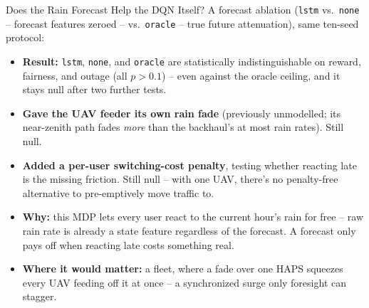 \documentclass[aspectratio=169]{beamer}
\begin{document}
\begin{frame}{Does the Rain Forecast Help the DQN Itself?}
\footnotesize
A forecast ablation (\texttt{lstm} vs.\ \texttt{none} -- forecast
features zeroed -- vs.\ \texttt{oracle} -- true future attenuation),
same ten-seed protocol:
\vspace{2mm}
\begin{itemize}\setlength{\itemsep}{4pt}
  \item \textbf{Result:} \texttt{lstm}, \texttt{none}, and
        \texttt{oracle} are statistically indistinguishable on reward,
        fairness, and outage (all $p>0.1$) -- even against the oracle
        ceiling, and it stays null after two further tests.
  \item \textbf{Gave the UAV feeder its own rain fade} (previously
        unmodelled; its near-zenith path fades \emph{more} than the
        backhaul's at most rain rates). Still null.
  \item \textbf{Added a per-user switching-cost penalty}, testing
        whether reacting late is the missing friction. Still null --
        with one UAV, there's no penalty-free alternative to
        pre-emptively move traffic to.
  \item \textbf{Why:} this MDP lets every user react to the current
        hour's rain for free -- raw rain rate is already a state
        feature regardless of the forecast. A forecast only pays off
        when reacting late costs something real.
  \item \textbf{Where it would matter:} a fleet, where a fade over one
        HAPS squeezes every UAV feeding off it at once -- a
        synchronized surge only foresight can stagger.
\end{itemize}
\end{frame}
\end{document}
